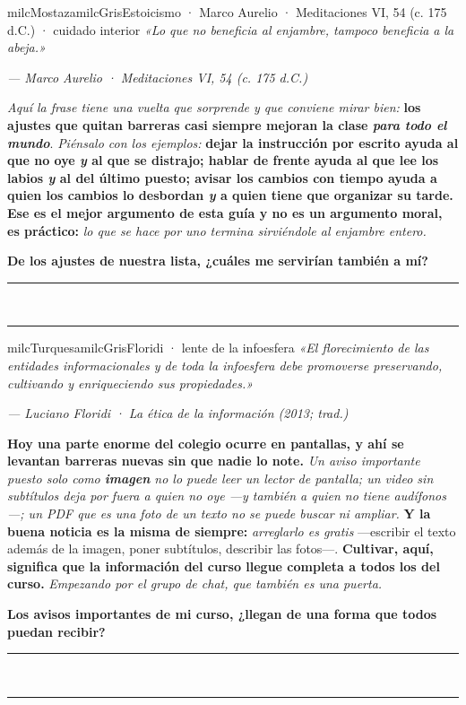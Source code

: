 \documentclass[11pt,letterpaper]{article}
\newcommand{\linead}[1]{\noindent\color{milcLinea}\rule{#1}{0.5pt}\color{milcNegro}}
\begin{document}
\begin{softbox}{milcMostaza}{milcGris}{Estoicismo · Marco Aurelio · Meditaciones VI, 54 (c. 175 d.C.) · cuidado interior}
\textit{«Lo que no beneficia al enjambre, tampoco beneficia a la abeja.»}

{\footnotesize\itshape\color{milcNegro!70}--- Marco Aurelio · Meditaciones VI, 54 (c. 175 d.C.)}

\emph{Aquí la frase tiene una vuelta que sorprende y que conviene mirar bien:} \textbf{los ajustes que quitan barreras casi siempre mejoran la clase \emph{para todo el mundo}}. \emph{Piénsalo con los ejemplos:} \textbf{dejar la instrucción por escrito ayuda al que no oye \emph{y} al que se distrajo; hablar de frente ayuda al que lee los labios \emph{y} al del último puesto; avisar los cambios con tiempo ayuda a quien los cambios lo desbordan \emph{y} a quien tiene que organizar su tarde.} \textbf{Ese es el mejor argumento de esta guía y no es un argumento moral, es práctico:} \emph{lo que se hace por uno termina sirviéndole al enjambre entero.}

\textbf{De los ajustes de nuestra lista, ¿cuáles me servirían también a mí?}
\end{softbox}
\linead{\linewidth}\\[1mm]
\linead{\linewidth}

\begin{softbox}{milcTurquesa}{milcGris}{Floridi · lente de la infoesfera}
\textit{«El florecimiento de las entidades informacionales y de toda la infoesfera debe promoverse preservando, cultivando y enriqueciendo sus propiedades.»}

{\footnotesize\itshape\color{milcNegro!70}--- Luciano Floridi · La ética de la información (2013; trad.)}

\textbf{Hoy una parte enorme del colegio ocurre en pantallas, y ahí se levantan barreras nuevas sin que nadie lo note.} \emph{Un aviso importante puesto solo como \textbf{imagen} no lo puede leer un lector de pantalla; un video sin subtítulos deja por fuera a quien no oye ---y también a quien no tiene audífonos---; un PDF que es una foto de un texto no se puede buscar ni ampliar.} \textbf{Y la buena noticia es la misma de siempre:} \emph{arreglarlo es gratis} ---escribir el texto además de la imagen, poner subtítulos, describir las fotos---. \textbf{Cultivar, aquí, significa que la información del curso llegue completa a todos los del curso.} \emph{Empezando por el grupo de chat, que también es una puerta.}

\textbf{Los avisos importantes de mi curso, ¿llegan de una forma que todos puedan recibir?}
\end{softbox}
\linead{\linewidth}\\[1mm]
\linead{\linewidth}
\end{document}
